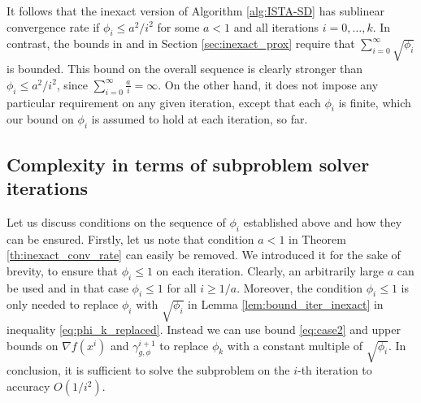 \documentclass[11pt]{article}
\numberwithin{equation}{section}
\begin{document}
\begin{remark} It follows that the inexact version of Algorithm \ref{alg:ISTA-SD}   has sublinear convergence rate if 
$\phi_i\leq a^2/i^2$  for some $a<1$ and all iterations $i=0, \ldots, k$. 
In contrast,  the bounds in \cite{Schmidtetal} and in Section \ref{sec:inexact_prox} 
require that $\sum_{i=0}^{\infty} \sqrt{\phi_i}$ is  bounded. 
This bound  on the overall sequence is clearly 
stronger than $\phi_i\leq a^2/i^2$, since $\sum_{i=0}^{\infty} \frac{a}{i}=\infty$. 
On the other hand, it does not impose any particular requirement on any given iteration, except that 
each $\phi_i$ is finite, which our bound on $\phi_i$ is assumed to hold at each iteration, so far. 
\end{remark}

\subsection{Complexity in terms of subproblem solver iterations}
Let us discuss  conditions on the sequence of $\phi_i$ established above and how they can be ensured. 
Firstly, let us note that condition $a<1$ in Theorem \ref{th:inexact_conv_rate} can easily be removed. 
We introduced it for the sake of brevity, to ensure that $\phi_i\leq 1$ on each iteration. Clearly, an arbitrarily large $a$ can be used and in that case
$\phi_i\leq 1$ for all $i\geq 1/a$. Moreover, the condition $\phi_i\leq 1$ is only needed to replace $\phi_i$ with $\sqrt{\phi_i}$ in 
Lemma \ref{lem:bound_iter_inexact} in inequality \eqref{eq:phi_k_replaced}. Instead we can use bound \eqref{eq:case2} and 
upper bounds on $\nabla f(x^i)$ and $\gamma^{i+1}_{g,\phi}$ to replace $\phi_k$ with a constant multiple of $\sqrt{\phi_i}$. 
In conclusion, it is sufficient to solve the subproblem on the $i$-th iteration to accuracy $O(1/i^2)$. 
\end{document}
